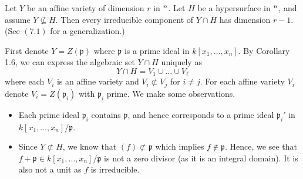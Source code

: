 \documentclass{hw_pset} %
\let\aa\relax
\DeclareMathOperator{\aa}{\mathbf{A}} %
\newcommand{\x}{x_1, \dots, x_n}    %
\newcommand{\idl}[1]{\mathfrak{#1}} %
\begin{document}
\begin{exercise}[1.8]
    Let $Y$ be an affine variety of dimension $r$ in $\aa^n$.
    Let $H$ be a hypersurface in $\aa^n$, and assume $Y \not\subseteq H$.
    Then every irreducible component of $Y \cap H$ has dimension $r-1$.
    (See $(7.1)$ for a generalization.)
\end{exercise}

\begin{solution}
    First denote $Y = Z(\idl{p})$ where $\idl{p}$ is a prime ideal in $k[\x]$.
    By Corollary 1.6, we can express the algebraic set $Y \cap H$ uniquely as 
    \[
        Y \cap H = V_1 \cup \dots \cup V_{\ell}
    \]
    where each $V_i$ is an affine variety and $V_i \not\subset V_j$ for $i \ne j$. 
    For each affine variety $V_i$ denote $V_i = Z(\idl{p}_i)$ with $\idl{p}_i$ prime. 
    We make some observations. 
    \begin{itemize}
        \item Each prime ideal $\idl{p}_i$ contains $\idl{p}$, and hence corresponds to a 
        prime ideal $\idl{p}_i'$ in $k[\x]/\idl{p}$.

        \item 
        Since $Y \not\subset H$, we know that $(f) \not\subset \idl{p}$ which implies 
        $f \not\in \idl{p}$. Hence, we see that $f + \idl{p} \in k[\x]/\idl{p}$ 
        is not a zero divisor (as it is an integral domain). It is also not a unit as 
        $f$ is irreducible. 


\end{itemize}
\end{solution}
\end{document}
